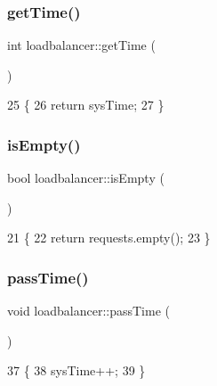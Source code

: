 \subsubsection{\texorpdfstring{get\+Time()}{getTime()}}
{\footnotesize\ttfamily int loadbalancer\+::get\+Time (\begin{DoxyParamCaption}{ }\end{DoxyParamCaption})}


\begin{DoxyCode}
25                           \{
26     \textcolor{keywordflow}{return} sysTime;
27 \}
\end{DoxyCode}
\mbox{\label{classloadbalancer_a542b0b5b5759c074e3e8d1cbf1f33b52}} 
\subsubsection{\texorpdfstring{is\+Empty()}{isEmpty()}}
{\footnotesize\ttfamily bool loadbalancer\+::is\+Empty (\begin{DoxyParamCaption}{ }\end{DoxyParamCaption})}


\begin{DoxyCode}
21                            \{
22     \textcolor{keywordflow}{return} requests.empty();
23 \}
\end{DoxyCode}
\mbox{\label{classloadbalancer_a4d793bdf97c72b577ada58a774c3bddb}} 
\subsubsection{\texorpdfstring{pass\+Time()}{passTime()}}
{\footnotesize\ttfamily void loadbalancer\+::pass\+Time (\begin{DoxyParamCaption}{ }\end{DoxyParamCaption})}


\begin{DoxyCode}
37                             \{
38     sysTime++;
39 \}
\end{DoxyCode}
\mbox{\label{classloadbalancer_a9716bb001708f3c7792df0d1c8689ab0}} 
